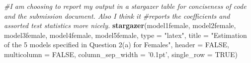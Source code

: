 \documentclass[]{article}
\newenvironment{Shaded}{\begin{snugshade}}{\end{snugshade}}
\newcommand{\CommentTok}[1]{\textcolor[rgb]{0.56,0.35,0.01}{\textit{#1}}}
\newcommand{\DataTypeTok}[1]{\textcolor[rgb]{0.13,0.29,0.53}{#1}}
\newcommand{\KeywordTok}[1]{\textcolor[rgb]{0.13,0.29,0.53}{\textbf{#1}}}
\newcommand{\NormalTok}[1]{#1}
\newcommand{\OtherTok}[1]{\textcolor[rgb]{0.56,0.35,0.01}{#1}}
\newcommand{\StringTok}[1]{\textcolor[rgb]{0.31,0.60,0.02}{#1}}
\begin{document}
\begin{Shaded}
\begin{Highlighting}[]
\CommentTok{#I am choosing to report my output in a stargazer table for conciseness of code and the submission document. Also I think it }
\CommentTok{#reports the coefficients and assorted test statistics more nicely.}
\KeywordTok{stargazer}\NormalTok{(model1female, model2female, model3female, model4female, model5female, }\DataTypeTok{type =} \StringTok{"latex"}\NormalTok{, }\DataTypeTok{title =} \StringTok{"Estimation of the 5 models specified in Question 2(a) for Females"}\NormalTok{, }\DataTypeTok{header =} \OtherTok{FALSE}\NormalTok{, }\DataTypeTok{multicolumn =} \OtherTok{FALSE}\NormalTok{, }\DataTypeTok{column_sep_width =} \StringTok{'0.1pt'}\NormalTok{, }\DataTypeTok{single_row =} \OtherTok{TRUE}\NormalTok{)}
\end{Highlighting}
\end{Shaded}
\end{document}
